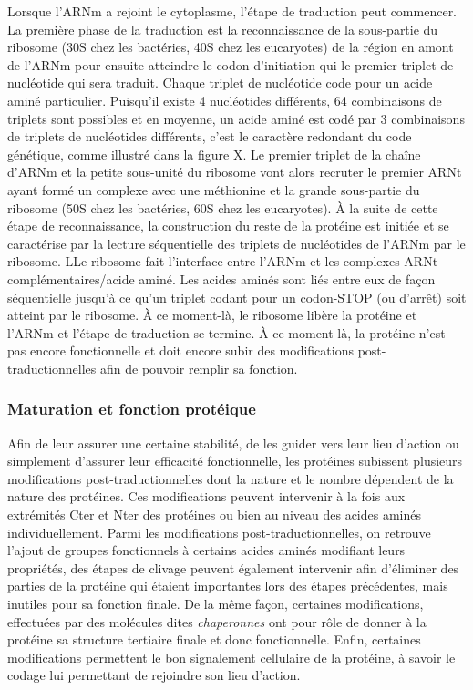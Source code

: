 Lorsque l'ARNm a rejoint le cytoplasme, l'étape de traduction peut commencer. La première phase de la traduction est la reconnaissance de la sous-partie du ribosome (30S chez les bactéries, 40S chez les eucaryotes) de la région en amont de l'ARNm pour ensuite atteindre le codon d'initiation qui le premier triplet de nucléotide qui sera traduit. Chaque triplet de nucléotide code pour un acide aminé particulier. Puisqu'il existe 4 nucléotides différents, 64 combinaisons de triplets sont possibles et en moyenne, un acide aminé est codé par 3 combinaisons de triplets de nucléotides différents, c'est le caractère redondant du code génétique, comme illustré dans la figure X. 
Le premier triplet de la chaîne d'ARNm et la petite sous-unité du ribosome vont alors recruter le premier ARNt ayant formé un complexe avec une méthionine et la grande sous-partie du ribosome (50S chez les bactéries, 60S chez les eucaryotes). À la suite de cette étape de reconnaissance, la construction du reste de la protéine est initiée et se caractérise par la lecture séquentielle des triplets de nucléotides de l'ARNm par le ribosome. LLe ribosome fait l'interface entre l'ARNm et les complexes ARNt complémentaires/acide aminé. Les acides aminés sont liés entre eux de façon séquentielle jusqu'à ce qu'un triplet codant pour un codon-STOP (ou d'arrêt) soit atteint par le ribosome. À ce moment-là, le ribosome libère la protéine et l'ARNm et l'étape de traduction se termine. À ce moment-là, la protéine n'est pas encore fonctionnelle et doit encore subir des modifications post-traductionnelles afin de pouvoir remplir sa fonction.

\subsubsection{Maturation et fonction protéique}

Afin de leur assurer une certaine stabilité, de les guider vers leur lieu d'action ou simplement d'assurer leur efficacité fonctionnelle, les protéines subissent plusieurs modifications post-traductionnelles dont la nature et le nombre dépendent de la nature des protéines. Ces modifications peuvent intervenir à la fois aux extrémités Cter et Nter des protéines ou bien au niveau des acides aminés individuellement. Parmi les modifications post-traductionnelles, on retrouve l'ajout de groupes fonctionnels à certains acides aminés modifiant leurs propriétés, des étapes de clivage peuvent également intervenir afin d'éliminer des parties de la protéine qui étaient importantes lors des étapes précédentes, mais inutiles pour sa fonction finale. De la même façon, certaines modifications, effectuées par des molécules dites \textit{chaperonnes} ont pour rôle de donner à la protéine sa structure tertiaire finale et donc fonctionnelle. Enfin, certaines modifications permettent le bon signalement cellulaire de la protéine, à savoir le codage lui permettant de rejoindre son lieu d'action.


